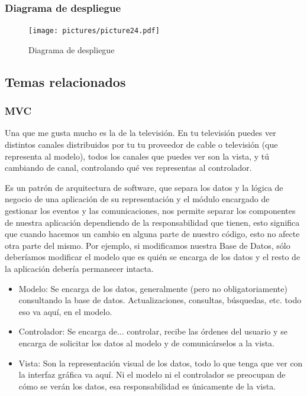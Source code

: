 \subsubsection{Diagrama de despliegue}

\begin{figure}[H]
\centering
\texttt{[image: pictures/picture24.pdf]}
\caption{Diagrama de despliegue}
\end{figure}

\subsection{Temas relacionados}

\subsubsection{MVC}

Una que me gusta mucho es la de la televisión. En tu televisión puedes ver distintos canales distribuidos por tu tu proveedor de cable o televisión (que representa al modelo), todos los canales que puedes ver son la vista, y tú cambiando de canal, controlando qué ves representas al controlador.

 Es un patrón de arquitectura de software, que separa los datos y la lógica de negocio de una aplicación de su representación y el módulo encargado de gestionar los eventos y las comunicaciones, nos permite separar los componentes de nuestra aplicación dependiendo de la responsabilidad que tienen, esto significa que cuando hacemos un cambio en alguna parte de nuestro código, esto no afecte otra parte del mismo. Por ejemplo, si modificamos nuestra Base de Datos, sólo deberíamos modificar el modelo que es quién se encarga de los datos y el resto de la aplicación debería permanecer intacta. 
 
\begin{itemize}
    \item Modelo: Se encarga de los datos, generalmente (pero no obligatoriamente) consultando la base de datos. Actualizaciones, consultas, búsquedas, etc. todo eso va aquí, en el modelo.
    \item Controlador: Se encarga de... controlar, recibe las órdenes del usuario y se encarga de solicitar los datos al modelo y de comunicárselos a la vista.
    \item Vista: Son la representación visual de los datos, todo lo que tenga que ver con la interfaz gráfica va aquí. Ni el modelo ni el controlador se preocupan de cómo se verán los datos, esa responsabilidad es únicamente de la vista.
\end{itemize}

